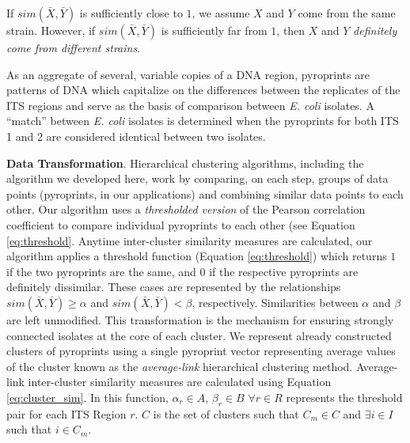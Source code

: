 \documentclass[12pt]{ucthesis}
\begin{document}
      If $sim(\bar{X}, \bar{Y})$ is
      sufficiently close to $1$, we assume $X$ and $Y$ come from the same strain.
      However, if $sim(\bar{X}, \bar{Y})$ is sufficiently far from $1$, then $X$ and
      $Y$ \textit{definitely come from different strains}.

      As an aggregate of several, variable copies of a DNA region, pyroprints
      are patterns of DNA which capitalize on the differences between the
      replicates of the ITS regions and serve as the basis of comparison
      between \textit{E. coli} isolates. A ``match'' between \textit{E. coli}
      isolates is determined when the pyroprints for both ITS 1 and 2 are
      considered identical between two isolates.

      \textbf{Data Transformation}. Hierarchical clustering algorithms, including the
      algorithm we developed here, work by comparing, on each step, groups of data
      points (pyroprints, in our applications) and combining similar data points to
      each other. Our algorithm uses a \textit{thresholded version} of the Pearson
      correlation coefficient to compare individual pyroprints to each other (see
      Equation \ref{eq:threshold}. Anytime inter-cluster similarity measures are
      calculated, our algorithm applies a threshold function (Equation
      \ref{eq:threshold}) which returns $1$ if the two pyroprints are the same, and
      $0$ if the respective pyroprints are definitely dissimilar. These cases are
      represented by the relationships $sim(\bar{X}, \bar{Y}) \ge \alpha$ and
      $sim(\bar{X}, \bar{Y}) < \beta$, respectively. Similarities between $\alpha$ and
      $\beta$ are left unmodified. This transformation is the mechanism for ensuring
      strongly connected isolates at the core of each cluster. We represent already
      constructed clusters of pyroprints using a single pyroprint vector representing
      average values of the cluster known as the \textit{average-link} hierarchical
      clustering method. Average-link inter-cluster similarity measures are
      calculated using Equation \ref{eq:cluster_sim}. In this function, $\alpha_r \in
      A$, $\beta_r \in B$ $\forall r \in R$ represents the threshold pair for each
      ITS Region $r$. $C$ is the set of clusters such that $C_m \in C$ and $\exists i
      \in I$ such that $i \in C_m$.
\end{document}
